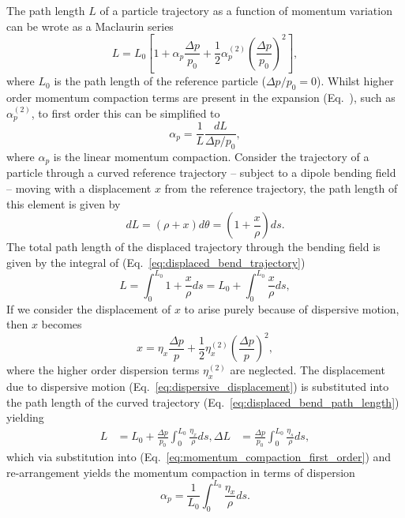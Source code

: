 \documentclass[../main.tex]{subfiles}
\begin{document}
The path length $L$ of a particle trajectory as a function of momentum variation can be wrote as a Maclaurin series \cite{wolski2012longitudinal}
\begin{equation}
L = L_{0}\left[1+\alpha_{p}\frac{\Delta p}{p_{0}}+\frac{1}{2}\alpha_{p}^{\left(2\right)}\left(\frac{\Delta p}{p_{0}}\right)^{2}\right],
\label{eq:path_length_expansion}    
\end{equation}
where $L_{0}$ is the path length of the reference particle ($\Delta p/p_{0}=0$). Whilst higher order momentum compaction terms are present in the expansion (Eq.~), such as $\alpha_{p}^{\left(2\right)}$, to first order this can be simplified to
\begin{equation}
\alpha_{p} = \frac{1}{L}\frac{dL}{\Delta p/p_{0}},
\label{eq:momentum_compaction_first_order}    
\end{equation}
where $\alpha_{p}$ is the linear momentum compaction. Consider the trajectory of a particle through a curved reference trajectory -- subject to a dipole bending field -- moving with a displacement $x$ from the reference trajectory, the path length of this element is given by
\begin{equation}
dL = \left(\rho+x\right)d\theta = \left(1+\frac{x}{\rho}\right)ds.
\label{eq:displaced_bend_trajectory}    
\end{equation}
The total path length of the displaced trajectory through the bending field is given by the integral of (Eq.~\ref{eq:displaced_bend_trajectory})
\begin{equation}
L = \int_{0}^{L_{0}} 1+\frac{x}{\rho} ds = L_{0} + \int_{0}^{L_{0}}\frac{x}{\rho}ds, 
\label{eq:displaced_bend_path_length}    
\end{equation}
If we consider the displacement of $x$ to arise purely because of dispersive motion, then $x$ becomes
\begin{equation}
x = \eta_{x}\frac{\Delta p}{p} + \frac{1}{2}\eta_{x}^{\left(2\right)}\left(\frac{\Delta p}{p}\right)^{2},
\label{eq:dispersive_displacement}    
\end{equation}
where the higher order dispersion terms $\eta_{x}^{\left(2\right)}$ are neglected. The displacement due to dispersive motion (Eq.~\ref{eq:dispersive_displacement}) is substituted into the path length of the curved trajectory (Eq.~\ref{eq:displaced_bend_path_length}) yielding
\begin{align}
L &= L_{0} + \frac{\Delta p}{p_{0}}\int_{0}^{L_{0}}\frac{\eta_{x}}{\rho}ds,
\Delta L &= \frac{\Delta p}{p_{0}}\int_{0}^{L_{0}}\frac{\eta_{s}}{\rho}ds,
\label{eq:dispersive_path_length_variation}
\end{align}
which via substitution into (Eq.~\ref{eq:momentum_compaction_first_order}) and re-arrangement yields the momentum compaction in terms of dispersion
\begin{equation}
\alpha_{p} = \frac{1}{L_{0}}\int_{0}^{L_{0}}\frac{\eta_{x}}{\rho}ds.
\label{eq:momentum_compaction_dispersion}    
\end{equation}
\end{document}
